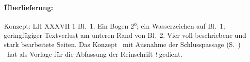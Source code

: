 %
%
%
%
%
%
%
%
% 
%
%
%
\begin{ledgroupsized}[r]{120mm}
\footnotesize
\pstart
\noindent\textbf{Überlieferung:}
\pend
\end{ledgroupsized}
%
\begin{ledgroupsized}[r]{114mm}
\footnotesize
\pstart \parindent -6mm
%
Konzept: LH XXXVII 1 Bl.~1.
Ein Bogen 2\textsuperscript{o};
ein Wasserzeichen auf Bl.~1;
geringfügiger Textverlust am unteren Rand von Bl.~2.
Vier voll beschriebene und stark bearbeitete Seiten.
Das Konzept %
\textendash\ mit Ausnahme der Schlusspassage (S.~) \textendash\
hat als Vorlage für die Abfassung der Reinschrift \textit{l} gedient.
%
\pend
\end{ledgroupsized}
